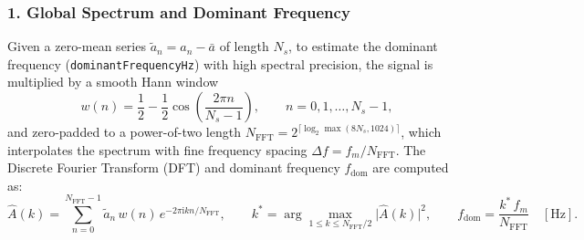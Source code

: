\documentclass[11pt,a4paper]{article}
\newcommand{\unit}[1]{\mathrm{#1}}
\begin{document}
\subsubsection*{1. Global Spectrum and Dominant Frequency}
Given a zero-mean series $\tilde a_n = a_n - \bar{a}$ of length $N_s$, to estimate the dominant frequency
(\texttt{dominantFrequencyHz}) with high spectral precision, the signal is multiplied by a smooth Hann window
\begin{equation}
  w(n) = \frac{1}{2} - \frac{1}{2}\cos\!\left(\frac{2\pi n}{N_s - 1}\right),
  \qquad n = 0,1,\ldots,N_s - 1,
  \label{eq:ventana-hann}
\end{equation}
and zero-padded to a power-of-two length $N_{\mathrm{FFT}} = 2^{\lceil\log_2\max(8N_s, 1024)\rceil}$, which
interpolates the spectrum with fine frequency spacing $\Delta f = f_m / N_{\mathrm{FFT}}$. The Discrete Fourier
Transform (DFT) and dominant frequency $f_{\mathrm{dom}}$ are computed as:
\begin{equation}
  \widehat{A}(k) = \sum_{n=0}^{N_{\mathrm{FFT}}-1} \tilde a_n\,w(n)\,e^{-2\pi\mathrm{i}kn/N_{\mathrm{FFT}}},
  \qquad
  k^\ast = \arg\max_{1\le k \le N_{\mathrm{FFT}}/2} \bigl|\widehat{A}(k)\bigr|^2,
  \qquad
  f_{\mathrm{dom}} = \frac{k^\ast\,f_m}{N_{\mathrm{FFT}}}\quad[\unit{Hz}].
  \label{eq:fft-dominante}
\end{equation}
\end{document}
